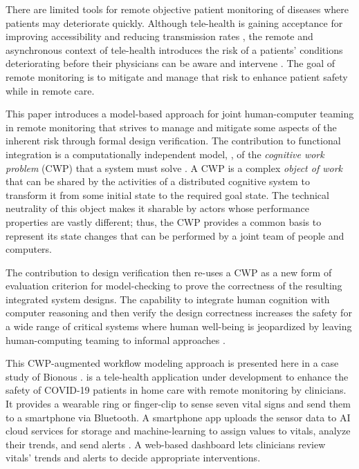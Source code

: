 There are limited tools for remote objective patient monitoring of diseases where patients may deteriorate quickly.
Although tele-health is gaining acceptance for improving accessibility and reducing transmission rates \cite{10.1093/jamia/ocaa048,telehealth,10.1093/jamia/ocaa067}, the remote and asynchronous context of tele-health introduces the risk of a patients' conditions deteriorating before their physicians can be aware and intervene \cite{10.1097/ALN.0000000000003578}.
The goal of remote monitoring is to mitigate and manage that risk to enhance patient safety while in remote care. 

This paper introduces a model-based approach for joint human-computer teaming in remote monitoring that strives to manage and mitigate some aspects of the inherent risk through formal design verification.
The contribution to functional integration is a computationally independent model, \cite{garrido}, of the \emph{cognitive work problem} (CWP) that a system must solve \cite{workflowmodel,workcentered,BERRY201615,chi2010}. 
A CWP is a complex \emph{object of work} that can be shared by the activities of a distributed cognitive system to transform it from some initial state to the required goal state.
The technical neutrality of this object makes it sharable by actors whose performance properties are vastly different; thus, the CWP provides a common basis to represent its state changes that can be performed by a joint team of people and computers.

The contribution to design verification then re-uses a CWP as a new form of evaluation criterion for model-checking to prove the correctness of the resulting integrated system designs.
The capability to integrate human cognition with computer reasoning and then verify the design correctness increases the safety for a wide range of critical systems where human well-being is jeopardized by leaving human-computing teaming to informal approaches \cite{remote,Aalam229}.

This CWP-augmented workflow modeling approach is presented here in a case study of Bionous \phware.
\phware is a tele-health application under development to enhance the safety of COVID-19 patients in home care with remote monitoring by clinicians.
It provides a wearable ring or finger-clip to sense seven vital signs and send them to a smartphone via Bluetooth.
A smartphone app uploads the sensor data to AI cloud services for storage and machine-learning to assign values to vitals, analyze their trends, and send alerts \cite{Altschul2004PredictiveMI,10.2307/2984877,10.5555/1643031.1643047}.
A web-based dashboard lets clinicians review vitals' trends and alerts to decide appropriate interventions.

